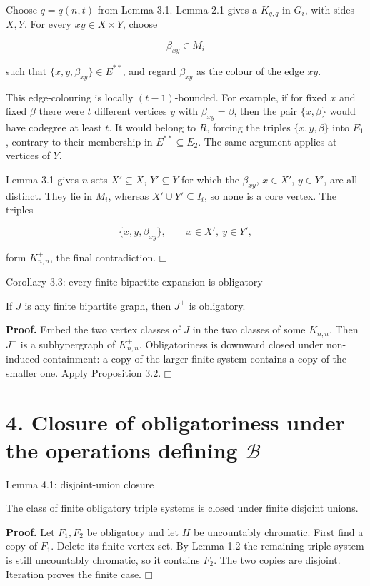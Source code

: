 \documentclass[11pt]{article}
\providecommand{\square}{\mdlgwhtsquare}
\begin{document}
Choose \(q=q(n,t)\) from Lemma 3.1. Lemma 2.1 gives a \(K_{q,q}\) in \(G_i\), with sides \(X,Y\). For every \(xy\in X\times Y\), choose

\[
\beta_{xy}\in M_i
\]

such that \(\{x,y,\beta_{xy}\}\in E^{**}\), and regard \(\beta_{xy}\) as the colour of the edge \(xy\).

This edge-colouring is locally \((t-1)\)-bounded. For example, if for fixed \(x\) and fixed \(\beta\) there were \(t\) different vertices \(y\) with \(\beta_{xy}=\beta\), then the pair \(\{x,\beta\}\) would have codegree at least \(t\). It would belong to \(R\), forcing the triples \(\{x,y,\beta\}\) into \(E_1\), contrary to their membership in \(E^{**}\subseteq E_2\). The same argument applies at vertices of \(Y\).

Lemma 3.1 gives \(n\)-sets \(X'\subseteq X\), \(Y'\subseteq Y\) for which the \(\beta_{xy}\), \(x\in X'\), \(y\in Y'\), are all distinct. They lie in \(M_i\), whereas \(X'\cup Y'\subseteq I_i\), so none is a core vertex. The triples

\[
\{x,y,\beta_{xy}\},
\qquad x\in X',\ y\in Y',
\]

form \(K_{n,n}^{+}\), the final contradiction. \(\square\)

\label{corollary-3.3-every-finite-bipartite-expansion-is-obligatory}
\begin{corollarybox}{Corollary 3.3: every finite bipartite expansion is obligatory}

If \(J\) is any finite bipartite graph, then \(J^+\) is obligatory.

\end{corollarybox}
\textbf{Proof.} Embed the two vertex classes of \(J\) in the two classes of some \(K_{n,n}\). Then \(J^+\) is a subhypergraph of \(K_{n,n}^+\). Obligatoriness is downward closed under non-induced containment: a copy of the larger finite system contains a copy of the smaller one. Apply Proposition 3.2. \(\square\)

\section{\texorpdfstring{4. Closure of obligatoriness under the operations defining \(\mathcal B\)}{4. Closure of obligatoriness under the operations defining \textbackslash mathcal B}}\label{closure-of-obligatoriness-under-the-operations-defining-mathcal-b}

\label{lemma-4.1-disjoint-union-closure}
\begin{lemmabox}{Lemma 4.1: disjoint-union closure}

The class of finite obligatory triple systems is closed under finite disjoint unions.

\end{lemmabox}
\textbf{Proof.} Let \(F_1,F_2\) be obligatory and let \(H\) be uncountably chromatic. First find a copy of \(F_1\). Delete its finite vertex set. By Lemma 1.2 the remaining triple system is still uncountably chromatic, so it contains \(F_2\). The two copies are disjoint. Iteration proves the finite case. \(\square\)
\end{document}
